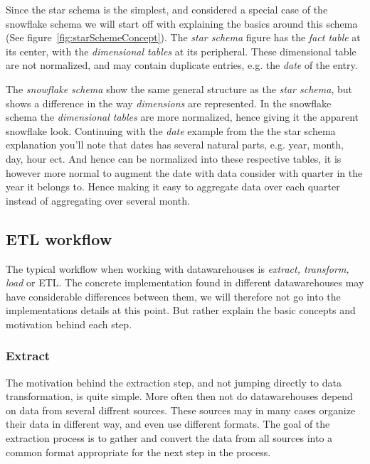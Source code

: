 	\bigskip\noindent
	Since the star schema is the simplest, and considered a special case of the snowflake schema
	we will start off with explaining the basics around this schema (See figure~\ref{fig:starSchemeConcept}). 
	The \textit{star schema} figure has the \textit{fact table} at its center, with the \textit{dimensional tables} at its peripheral. 
	These dimensional table are not normalized, and may contain duplicate entries, e.g. the \textit{date} of the entry.
		
	
	\bigskip\noindent
	The \textit{snowflake schema} show the same general structure as the \textit{star schema}, 
	but shows a difference in the way \textit{dimensions} are represented. 
	In the snowflake schema the \textit{dimensional tables} are more normalized, hence giving it the apparent snowflake look.
	Continuing with the \textit{date}	example from the the star schema explanation you'll note that dates has several natural 
	parts, e.g. year, month, day, hour ect. And hence can be normalized into these respective tables, 
	it is however more normal to augment the date with data consider with quarter in the year it belongs to. 
	Hence making it easy to aggregate data over each quarter instead of aggregating over several month.
	
	
	\subsection{ETL workflow}
		The typical workflow when working with datawarehouses is \textit{extract, transform, load} or ETL. 
		The concrete implementation found in different datawarehouses may have considerable differences between them, 
		we will therefore not go into the implementations details at this point. But rather explain the basic concepts
		and motivation behind each step.
		
		\subsubsection{Extract}
			The motivation behind the extraction step, and not jumping directly to data transformation, is quite simple. More often then not do datawarehouses depend on data from several diffrent sources. These sources may in many cases organize their data in different way, and even use different formats. 
			The goal of the extraction process is to gather and convert the data from all sources into a common format appropriate for the next step in the process.
			
